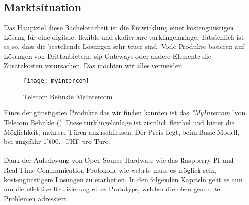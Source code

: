 \subsection{Marktsituation}
\label{sec:chapterexample}
Das Hauptziel diese Bachelorarbeit ist die Entwicklung einer kostengünstigen Lösung für eine digitale, flexible und skalierbare \gls{turklingelanlage}. Tatsächlich ist es so, dass die bestehende Lösungen sehr teuer sind. Viele Produkte basieren auf Lösungen von Drittanbietern, \gls{sip} Gateways oder andere Elemente die Zusatzkosten verursachen. Das möchten wir alles vermeiden.

\begin{figure}[htb!]
	\begin{center}
		\texttt{[image: myintercom]}
		\caption[Telecom Behnkle MyIntercom]{Telecom Behnkle MyIntercom}
		\label{fig:myintercom}
	\end{center}
\end{figure}

Eines der günstigsten Produkte das wir finden konnten ist das \textit{"MyIntercom"} von Telecom Behnkle (). Diese \gls{turklingelanlage} ist ziemlich flexibel und bietet die Möglichkeit, mehrere Türen anzuschliessen. Der Preis liegt, beim Basic-Modell, bei ungefähr 1’600.- CHF pro Türe.
\\
\\
Dank der Aufschwung von Open Source Hardware wie das Raspberry PI und Real Time Communication Protokolle wie \gls{webrtc} muss es möglich sein, kostengünstigere Lösungen zu erarbeiten. In den folgenden Kapiteln geht es nun um die effektive Realisierung eines Prototyps, welcher die oben genannte Problemen adressiert.
\newpage